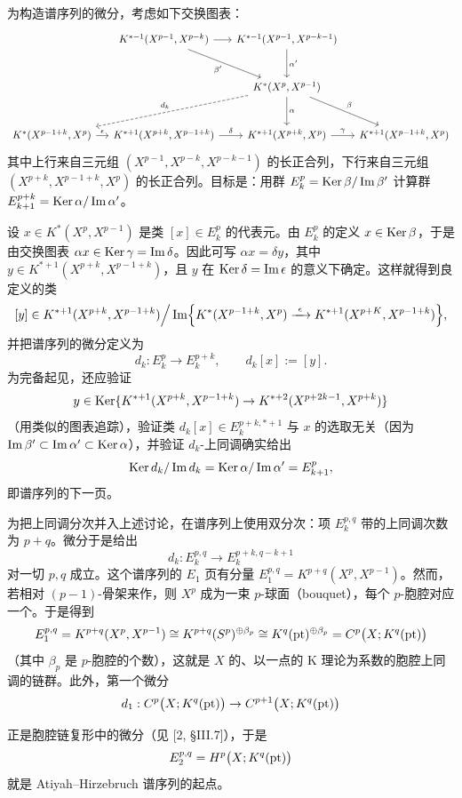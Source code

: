 为构造谱序列的微分，考虑如下交换图表：
\[
\begin{tikzcd}[row sep=large, column sep=small]
& K^{*-1}(X^{p-1},X^{p-k}) \arrow[r] \arrow[dr,"\beta'"'] & K^{*-1}(X^{p-1},X^{p-k-1}) \arrow[d,"\alpha'"] & \\
& & K^*(X^p,X^{p-1}) \arrow[dll,dashed,"d_k"'] \arrow[d,"\alpha"] \arrow[dr,"\beta"] & \\
K^*(X^{p-1+k},X^p) \arrow[r,"\epsilon"] & K^{*+1}(X^{p+k},X^{p-1+k}) \arrow[r,"\delta"] & K^{*+1}(X^{p+k},X^p) \arrow[r,"\gamma"] & K^{*+1}(X^{p-1+k},X^p)
\end{tikzcd}
\]
其中上行来自三元组 $(X^{p-1},X^{p-k},X^{p-k-1})$ 的长正合列，下行来自三元组 $(X^{p+k},X^{p-1+k},X^p)$ 的长正合列。目标是：用群 $E^p_k=\operatorname{Ker}\beta/\operatorname{Im}\beta'$ 计算群 $E^{p+k}_{k+1}=\operatorname{Ker}\alpha/\operatorname{Im}\alpha'$。

设 $x\in K^*(X^p,X^{p-1})$ 是类 $[x]\in E^p_k$ 的代表元。由 $E^p_k$ 的定义 $x\in\operatorname{Ker}\beta$，于是由交换图表 $\alpha x\in\operatorname{Ker}\gamma=\operatorname{Im}\delta$。因此可写 $\alpha x=\delta y$，其中 $y\in K^{*+1}(X^{p+k},X^{p-1+k})$，且 $y$ 在 $\operatorname{Ker}\delta=\operatorname{Im}\epsilon$ 的意义下确定。这样就得到良定义的类
\[
[y]\in K^{*+1}(X^{p+k},X^{p-1+k})\Big/\operatorname{Im}\Bigl\{K^*(X^{p-1+k},X^p)\xrightarrow{\ \epsilon\ }K^{*+1}(X^{p+K},X^{p-1+k})\Bigr\},
\]
并把谱序列的微分定义为
\[
d_k:E^p_k\to E^{p+k}_k,\qquad d_k[x]:=[y].
\]
为完备起见，还应验证
\[
y\in\operatorname{Ker}\{K^{*+1}(X^{p+k},X^{p-1+k})\to K^{*+2}(X^{p+2k-1},X^{p+k})\}
\]
（用类似的图表追踪），验证类 $d_k[x]\in E^{p+k,*+1}_k$ 与 $x$ 的选取无关（因为 $\operatorname{Im}\beta'\subset\operatorname{Im}\alpha'\subset\operatorname{Ker}\alpha$），并验证 $d_k$-上同调确实给出
\[
\operatorname{Ker} d_k/\operatorname{Im} d_k=\operatorname{Ker}\alpha/\operatorname{Im}\alpha'=E^p_{k+1},
\]
即谱序列的下一页。

为把上同调分次并入上述讨论，在谱序列上使用双分次：项 $E^{p,q}_k$ 带的上同调次数为 $p+q$。微分于是给出
\[
d_k:E^{p,q}_k\to E^{p+k,q-k+1}_k
\]
对一切 $p,q$ 成立。这个谱序列的 $E_1$ 页有分量 $E^{p,q}_1=K^{p+q}(X^p,X^{p-1})$。然而，若相对 $(p-1)$-骨架来作，则 $X^p$ 成为一束 $p$-球面（bouquet），每个 $p$-胞腔对应一个。于是得到
\[
E^{p,q}_1=K^{p+q}(X^p,X^{p-1})\cong K^{p+q}(S^p)^{\oplus\beta_p}\cong K^q(\mathrm{pt})^{\oplus\beta_p}=C^p\bigl(X;K^q(\mathrm{pt})\bigr)
\]
（其中 $\beta_p$ 是 $p$-胞腔的个数），这就是 $X$ 的、以一点的 K 理论为系数的胞腔上同调的链群。此外，第一个微分
\[
d_1:C^p\bigl(X;K^q(\mathrm{pt})\bigr)\to C^{p+1}\bigl(X;K^q(\mathrm{pt})\bigr)
\]

正是胞腔链复形中的微分（见 [2, §III.7]），于是
\[
E^{p,q}_2=H^p\bigl(X;K^q(\mathrm{pt})\bigr)
\]
就是 Atiyah--Hirzebruch 谱序列的起点。


